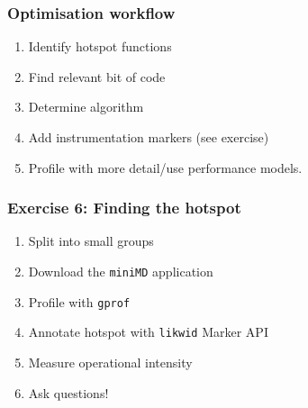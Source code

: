\documentclass[dvipsnames,presentation,aspectratio=169,14pt]{beamer}
\begin{document}
\begin{frame}
  \frametitle{Optimisation workflow}
  \begin{enumerate}[itemsep=6pt]
  \item Identify hotspot functions
  \item Find relevant bit of code
  \item Determine algorithm
  \item Add instrumentation markers (see exercise)
  \item Profile with more detail/use performance models.
  \end{enumerate}
\end{frame}

\begin{frame}[fragile]
  \frametitle{Exercise 6: Finding the hotspot}
  \begin{enumerate}[itemsep=8pt]
  \item Split into small groups
  \item Download the \texttt{miniMD} application
  \item Profile with \texttt{gprof}
  \item Annotate hotspot with \verb#likwid# Marker API
  \item Measure operational intensity
  \item Ask questions!
  \end{enumerate}
\end{frame}
\end{document}
